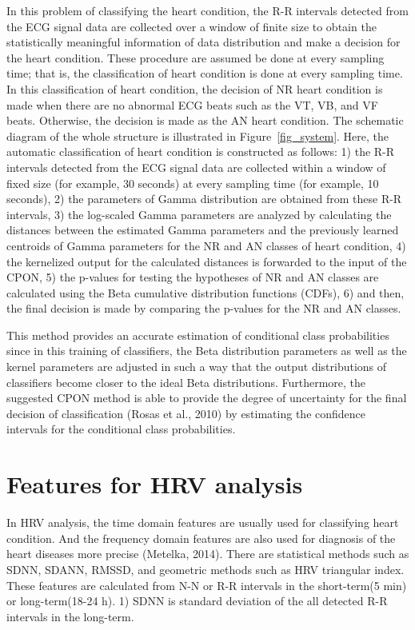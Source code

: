 \documentclass[times,twocolumn,final,authoryear]{elsarticle}
\begin{document}
In this problem of classifying the heart condition, the R-R intervals detected from the ECG signal data are collected over a window of finite size to obtain the statistically meaningful information of data distribution and make a decision for the heart condition. These procedure are assumed be done at every sampling time; that is, the classification of heart condition is done at every sampling time. In this classification of heart condition, the decision of NR heart condition is made when there are no abnormal ECG beats such as the VT, VB, and VF beats. Otherwise, the decision is made as the AN heart condition. The schematic diagram of the whole structure is illustrated in Figure~\ref{fig_system}. Here, the automatic classification of heart 
condition is constructed as follows: 1) the R-R intervals detected from the ECG signal data are collected within a window of fixed size (for example, 30 seconds) at every sampling time (for example, 10 seconds), 2) the parameters of Gamma distribution are obtained from these R-R intervals, 3) the log-scaled Gamma parameters are analyzed by calculating the distances between the estimated Gamma parameters and the previously learned centroids of Gamma parameters for the NR and AN classes of heart condition, 4) the kernelized output for the calculated distances is forwarded to the input of the CPON, 5) the p-values for testing the hypotheses of NR and AN classes are calculated using the Beta cumulative distribution functions (CDFs), 6) and then, the final decision is made by comparing the p-values for the NR and AN classes.

This method provides an accurate estimation of conditional class probabilities since in this training of classifiers, the Beta distribution parameters as well as the kernel parameters are adjusted in such a way that the output distributions of classifiers become closer to the ideal Beta distributions. Furthermore, the suggested CPON method is able to provide the degree of uncertainty for the final decision of classification (Rosas et al., 2010) by estimating the confidence intervals for the conditional class probabilities. 


\section{Features for HRV analysis}

 In HRV analysis, the time domain features are usually used for classifying heart condition. And the frequency domain features are also used for diagnosis of the heart diseases more precise (Metelka, 2014). There are statistical methods such as SDNN, SDANN, RMSSD, and geometric methods such as HRV triangular index. These features are calculated from N-N or R-R intervals in the short-term(5 min) or long-term(18-24 h). 1) SDNN is standard deviation of the all detected R-R intervals in the long-term. 
\end{document}
